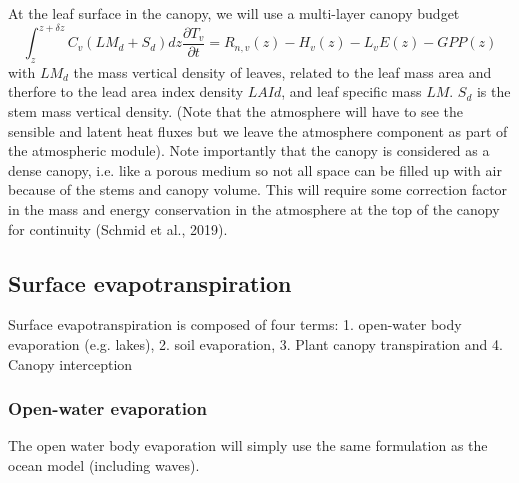 \documentclass{report}
\begin{document}
At the leaf surface in the canopy, we will use a multi-layer canopy budget
\begin{equation}
    \int_z^{z+\delta z}{C_v (LM_d+S_d) dz\frac{\partial T_v}{\partial t}} = R_{n,v}(z) -H_v(z)-L_vE(z)-GPP(z)
\end{equation}
with $LM_d$ the mass vertical density of leaves, related to the leaf mass area and therfore to the lead area index density $LAId$, and leaf specific mass $LM$. $S_d$ is the stem mass vertical density.
(Note that the atmosphere will have to see the sensible and latent heat fluxes but we leave the atmosphere component as part of the atmospheric module). Note importantly that the canopy is considered as a dense canopy, i.e. like a porous medium so not all space can be filled up with air because of the stems and canopy volume. This will require some correction factor in the mass and energy conservation in the atmosphere at the top of the canopy for continuity (Schmid et al., 2019).

\subsection{Surface evapotranspiration}
Surface evapotranspiration is composed of four terms: 1. open-water body evaporation (e.g. lakes), 2. soil evaporation, 3. Plant canopy transpiration and 4. Canopy interception
\subsubsection{Open-water evaporation}
The open water body evaporation will simply use the same formulation as the ocean model (including waves).
\end{document}
